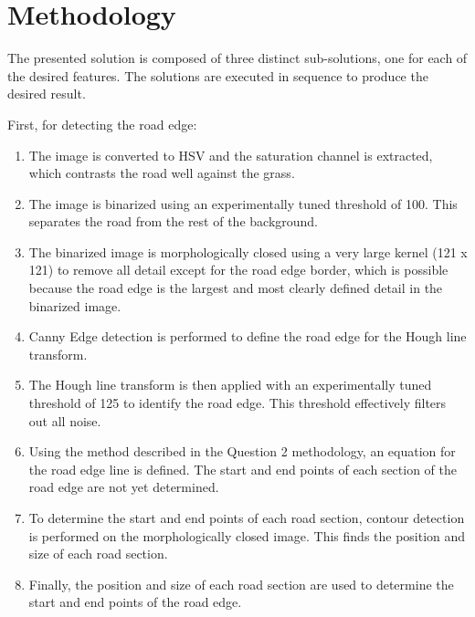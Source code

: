 \newpage
\section{Methodology}

The presented solution is composed of three distinct sub-solutions, one for each of the desired features. The solutions are executed in sequence to produce the desired result.

First, for detecting the road edge:
\begin{enumerate}
  \item The image is converted to HSV and the saturation channel is extracted, which contrasts the road well against the grass.

  \item The image is binarized using an experimentally tuned threshold of 100. This separates the road from the rest of the background.

  \item The binarized image is morphologically closed using a very large kernel (121 x 121) to remove all detail except for the road edge border, which is possible because the road edge is the largest and most clearly defined detail in the binarized image.

  \item Canny Edge detection is performed to define the road edge for the Hough line transform.

  \item The Hough line transform is then applied with an experimentally tuned threshold of 125 to identify the road edge. This threshold effectively filters out all noise.

  \item Using the method described in the Question 2 methodology, an equation for the road edge line is defined. The start and end points of each section of the road edge are not yet determined.

  \item To determine the start and end points of each road section, contour detection is performed on the morphologically closed image. This finds the position and size of each road section.

  \item Finally, the position and size of each road section are used to determine the start and end points of the road edge.

\end{enumerate}


